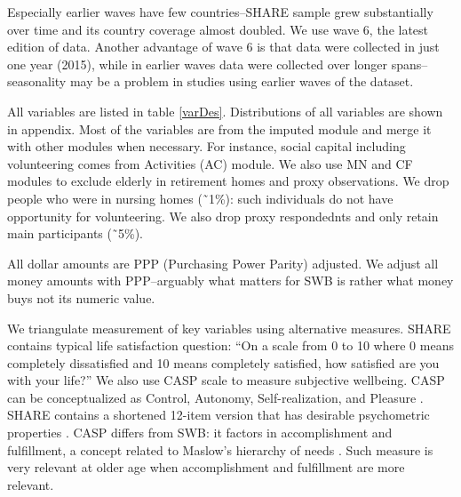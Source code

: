 \documentclass[10pt, letterpaper]{article}
\begin{document}
\begin{spacing}{1.4}
Especially earlier waves have few countries--SHARE sample grew substantially
over time and its country coverage almost doubled.
We use  wave 6, the latest edition of data. Another advantage of wave 6 is that
data were collected in just one year (2015), %
while in earlier waves data were collected over longer spans--seasonality may be
a problem in studies using earlier waves of the dataset.


All variables are listed in table \ref{varDes}. Distributions of all variables are shown in appendix.
Most of the variables are from the imputed module and merge
it with other modules when necessary. For instance, social capital including
volunteering comes from Activities (AC) module. We also use MN and CF modules to
exclude elderly in retirement homes and proxy observations.
%
We drop people who were in nursing homes (\~\ 1\%): such individuals do not have
opportunity for volunteering. We also drop proxy respondednts and only retain
main participants (\~\ 5\%). %



All dollar amounts are PPP (Purchasing Power Parity) adjusted. We adjust all money amounts with
PPP--arguably what matters for SWB is rather what money buys not its numeric value.

We triangulate measurement of key variables using alternative  measures. 
SHARE contains typical life satisfaction question: %
``On a scale from 0 to 10 where 0 means completely dissatisfied and 10 means
completely satisfied, how satisfied
are you with your life?'' We also use CASP scale to measure subjective
wellbeing. CASP can be conceptualized as Control, Autonomy,
Self-realization, and Pleasure \citep{hyde2003measure}. SHARE contains a shortened 12-item version that has
desirable psychometric properties \citep{knesbeck2005quality}. CASP differs from
SWB: it factors in accomplishment and fulfillment, a concept related to Maslow's
hierarchy of needs \citep{maslow87}. Such measure is  very relevant at older age
when accomplishment and fulfillment are more relevant. %


\end{spacing}
\end{document}
